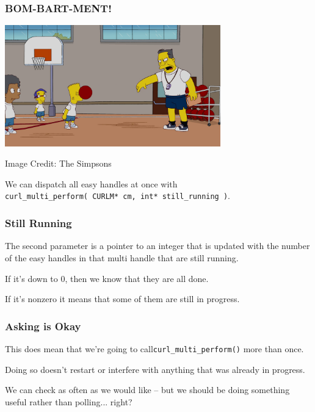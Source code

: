 \begin{frame}
	\frametitle{BOM-BART-MENT!}
	\begin{center}
		\includegraphics[width=0.7\textwidth]{images/Bombardment.png}
	\end{center}
	\hfill Image Credit: The Simpsons

	We can dispatch all easy handles at once with\\
	\texttt{curl\_multi\_perform( CURLM* cm, int* still\_running )}.


\end{frame}

\begin{frame}
	\frametitle{Still Running}

	The second parameter is a pointer to an integer that is updated with the number of the easy handles in that multi handle that are still running.

	If it's down to 0, then we know that they are all done.

	If it's nonzero it means that some of them are still in progress.


\end{frame}

\begin{frame}
	\frametitle{Asking is Okay}

	This does mean that we're going to call\texttt{curl\_multi\_perform()} more than once.

	Doing so doesn't restart or interfere with anything that was already in progress.

	We can check as often as we would like -- but we should be doing something useful rather than polling... right?

\end{frame}


